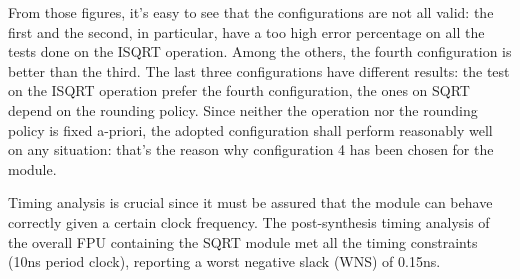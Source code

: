 \documentclass[paper=letter, fontsize=12pt]{article}
\begin{document}
From those figures, it's easy to see that the configurations are not all valid: the first and the second, in particular, have a too high error percentage on all the tests done on the ISQRT operation. Among the others, the fourth configuration is better than the third. The last three configurations have different results: the test on the ISQRT operation prefer the fourth configuration, the ones on SQRT depend on the rounding policy. Since neither the operation nor the rounding policy is fixed a-priori, the adopted configuration shall perform reasonably well on any situation: that's the reason why configuration 4 has been chosen for the module.

Timing analysis is crucial since it must be assured that the module can behave correctly given a certain clock frequency. The post-synthesis timing analysis of the overall FPU containing the SQRT module met all the timing constraints (10ns period clock), reporting a worst negative slack (WNS) of 0.15ns. 
\end{document}
